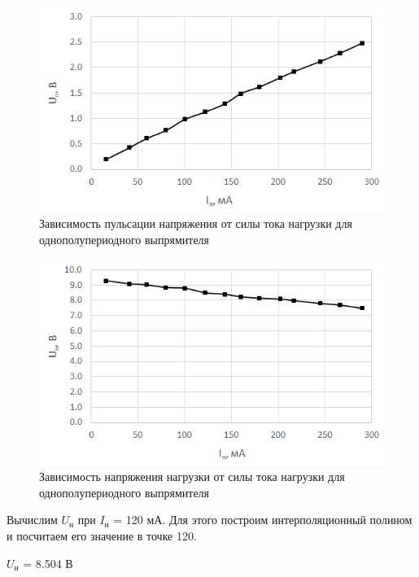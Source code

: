\begin{figure}[H]
	\begin{center}
		\includegraphics[width=15cm]{img/2}
		\caption{Зависимость пульсации напряжения от силы тока нагрузки для однополупериодного выпрямителя}
		\label{g:2} %
	\end{center}
\end{figure}

\begin{figure}[H]
	\begin{center}
		\includegraphics[width=15cm]{img/3}
		\caption{Зависимость напряжения нагрузки от силы тока нагрузки для однополупериодного выпрямителя}
		\label{g:3} %
	\end{center}
\end{figure}

Вычислим $U_\text{н}$ при $I_\text{н}$ = 120 мА. Для этого построим интерполяционный полином и посчитаем его значение в точке 120.

$U_\text{н}$ = 8.504 В

